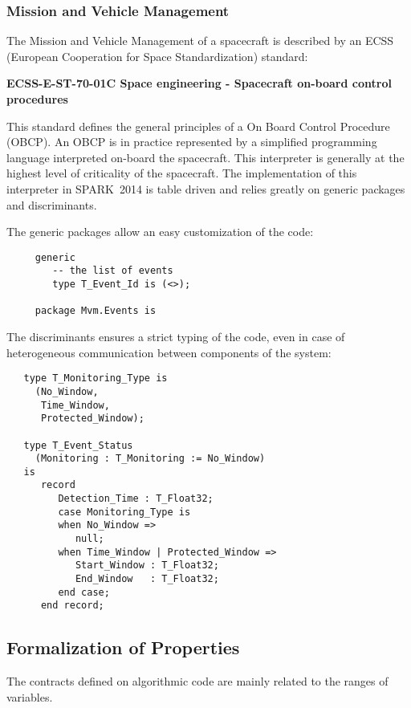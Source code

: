 \documentclass[10pt,a4paper,twocolumn]{article}
\newcommand{\newspark}{SPARK~2014\xspace}
\begin{document}
\subsubsection{Mission and Vehicle Management}

The Mission and Vehicle Management of a spacecraft is described by an ECSS (European Cooperation for Space Standardization) standard:

\begin{center}
{\bf ECSS-E-ST-70-01C Space engineering - Spacecraft on-board control procedures}
\end{center}

This standard defines the general principles of a On Board Control Procedure
(OBCP). An OBCP is in practice represented by a simplified programming language
interpreted on-board the spacecraft. This interpreter is generally at the
highest level of criticality of the spacecraft. The implementation of this
interpreter in \newspark is table driven and relies greatly on generic packages
and discriminants.

The generic packages allow an easy customization of the code:

\begin{lstlisting}
     generic
        -- the list of events
        type T_Event_Id is (<>);

     package Mvm.Events is
\end{lstlisting}

The discriminants ensures a strict typing of the code, even in case of heterogeneous communication between components of the system:

\begin{lstlisting}
   type T_Monitoring_Type is
     (No_Window,
      Time_Window,
      Protected_Window);

   type T_Event_Status
     (Monitoring : T_Monitoring := No_Window)
   is
      record
         Detection_Time : T_Float32;
         case Monitoring_Type is
         when No_Window =>
            null;
         when Time_Window | Protected_Window =>
            Start_Window : T_Float32;
            End_Window   : T_Float32;
         end case;
      end record;
\end{lstlisting}

\subsection{Formalization of Properties}

The contracts defined on algorithmic code are mainly related to the ranges of variables.
\end{document}
